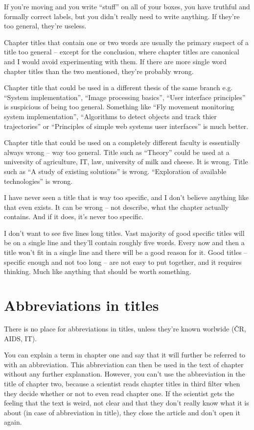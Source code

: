 If you're moving and you write ``stuff'' on all of your boxes, you have truthful and formally correct labels, but you didn't really need to write anything. If they're too general, they're useless.

Chapter titles that contain one or two words are usually the primary suspect of a title too general -- except for the conclusion, where chapter titles are canonical and I would avoid experimenting with them. If there are more single word chapter titles than the two mentioned, they're probably wrong.

Chapter title that could be used in a different thesis of the same branch e.g. ``System implementation'', ``Image processing basics'', ``User interface principles'' is suspicious of being too general. Something like ``Fly movement monitoring system implementation'', ``Algorithms to detect objects and track thier trajectories'' or ``Principles of simple web systems user interfaces'' is much better.

Chapter title that could be used on a completely different faculty is essentially always wrong -- way too general. Title such as ``Theory'' could be used at a university of agriculture, IT, law, university of milk and cheese. It is wrong. Title such as ``A study of existing solutions'' is wrong. ``Exploration of available technologies'' is wrong.

I have never seen a title that is way too specific, and I don't believe anything like that even exists. It can be wrong -- not describe, what the chapter actually contains. And if it does, it's never too specific.

I don't want to see five lines long titles. Vast majority of good specific titles will be on a single line and they'll contain roughly five words. Every now and then a title won't fit in a single line and there will be a good reason for it. Good titles -- specific enough and not too long -- are not easy to put together, and it requires thinking. Much like anything that should be worth something.


\section{Abbreviations in titles}

There is no place for abbreviations in titles, unless they're known worlwide (ČR, AIDS, IT).

You can explain a term in chapter one and say that it will further be referred to with an abbreviation. This abbreviation can then be used in the text of chapter without any further explanation. However, you can't use the abbreviation in the title of chapter two, because a scientist reads chapter titles in third filter when they decide whether or not to even read chapter one. If the scientist gets the feeling that the text is weird, not clear and that they don't really know what it is about (in case of abbreviation in title), they close the article and don't open it again.

